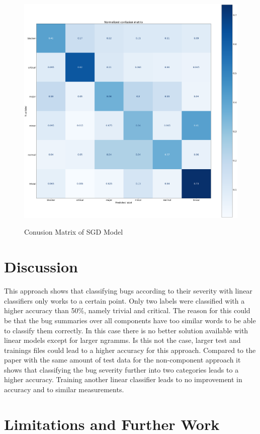 \documentclass[sigconf,screen]{acmart}
\begin{document}
\begin{figure}[h]
	\caption{Conusion Matrix of SGD Model}
	\centering
	\includegraphics[scale=0.1]{norm_conf_matrix_sgd}
	\label{fig:confMatSGD}	
\end{figure}


\section{Discussion}
This approach shows that classifying bugs according to their severity with linear classifiers only works to a certain point. Only two labels were classified with a higher accuracy than 50\%, namely trivial and critical. The reason for this could be that the bug summaries over all components have too similar words to be able to classify them correctly. In this case there is no better solution available with linear models except for larger ngramms. Is this not the case, larger test and trainings files could lead to a higher accuracy for this approach. Compared to the paper \cite{ourPaper} with the same amount of test data for the non-component approach it shows that classifying the bug severity further into two categories leads to a higher accuracy. Training another linear classifier leads to no improvement in accuracy and to similar measurements.

\section{Limitations and Further Work}







\appendix
\end{document}
